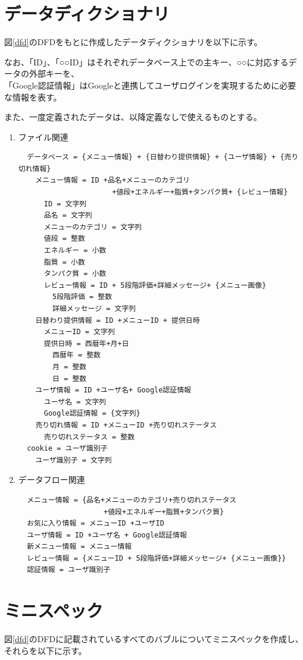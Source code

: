 \documentclass[a4paper]{jsarticle}
\begin{document}
\newpage

\section{データディクショナリ}
図\ref{dfd}のDFDをもとに作成したデータディクショナリを以下に示す。

なお、「ID」、「○○ID」はそれぞれデータベース上での主キー、○○に対応するデータの外部キーを、 \\
「Google認証情報」はGoogleと連携してユーザログインを実現するために必要な情報を表す。

また、一度定義されたデータは、以降定義なしで使えるものとする。

\begin{enumerate}
  \item ファイル関連
  \begin{verbatim}
  データベース = {メニュー情報} + {日替わり提供情報} + {ユーザ情報} + {売り切れ情報}
    メニュー情報 = ID +品名+メニューのカテゴリ
                      +値段+エネルギー+脂質+タンパク質+ {レビュー情報}
      ID = 文字列
      品名 = 文字列
      メニューのカテゴリ = 文字列
      値段 = 整数
      エネルギー = 小数
      脂質 = 小数
      タンパク質 = 小数
      レビュー情報 = ID + 5段階評価+詳細メッセージ+ {メニュー画像}
        5段階評価 = 整数
        詳細メッセージ = 文字列
    日替わり提供情報 = ID +メニューID + 提供日時
      メニューID = 文字列
      提供日時 = 西暦年+月+日
        西暦年 = 整数
        月 = 整数
        日 = 整数
    ユーザ情報 = ID +ユーザ名+ Google認証情報
      ユーザ名 = 文字列
      Google認証情報 = {文字列}
    売り切れ情報 = ID +メニューID +売り切れステータス
      売り切れステータス = 整数
  cookie = ユーザ識別子
    ユーザ識別子 = 文字列
  \end{verbatim}

  \newpage

  \item データフロー関連
  \begin{verbatim}
  メニュー情報 = {品名+メニューのカテゴリ+売り切れステータス
                    +値段+エネルギー+脂質+タンパク質}
  お気に入り情報 = メニューID +ユーザID
  ユーザ情報 = ID +ユーザ名 + Google認証情報
  新メニュー情報 = メニュー情報
  レビュー情報 = {メニューID + 5段階評価+詳細メッセージ+ {メニュー画像}}
  認証情報 = ユーザ識別子
  \end{verbatim}
\end{enumerate}

\section{ミニスペック}
図\ref{dfd}のDFDに記載されているすべてのバブルについてミニスペックを作成し、それらを以下に示す。
\end{document}

